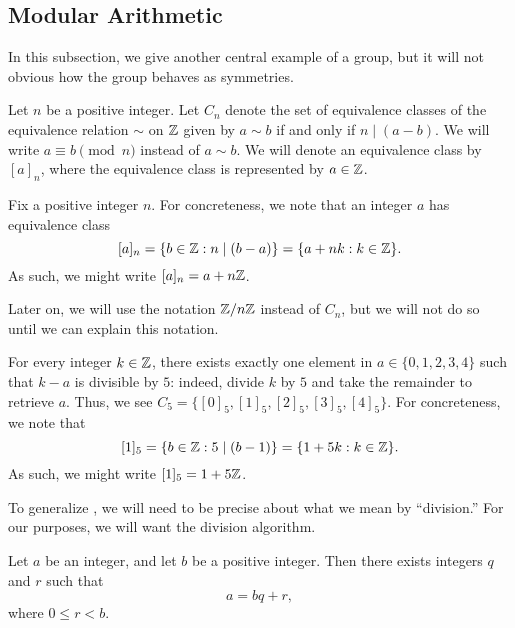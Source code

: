 \documentclass[../notes.tex]{subfiles}
\begin{document}
\subsection{Modular Arithmetic} \label{subsec:mods}
In this subsection, we give another central example of a group, but it will not obvious how the group behaves as symmetries.
\begin{definition}
    Let $n$ be a positive integer. Let $C_n$ denote the set of equivalence classes of the equivalence relation $\sim$ on $\mathbb Z$ given by $a\sim b$ if and only if $n\mid(a-b)$. We will write $a\equiv b\pmod n$ instead of $a\sim b$. We will denote an equivalence class by $[a]_n$, where the equivalence class is represented by $a\in\mathbb Z$.
\end{definition}
\begin{remark} \label{rem:concrete-coset}
    Fix a positive integer $n$. For concreteness, we note that an integer $a$ has equivalence class
    \[[a]_n=\{b\in\mathbb Z:n\mid(b-a)\}=\{a+nk:k\in\mathbb Z\}.\]
    As such, we might write $[a]_n=a+n\mathbb Z$.
\end{remark}
Later on, we will use the notation $\mathbb Z/n\mathbb Z$ instead of $C_n$, but we will not do so until we can explain this notation.
\begin{example} \label{ex:mod-5}
    For every integer $k\in\mathbb Z$, there exists exactly one element in $a\in\{0,1,2,3,4\}$ such that $k-a$ is divisible by $5$: indeed, divide $k$ by $5$ and take the remainder to retrieve $a$. Thus, we see $C_5=\{[0]_5,[1]_5,[2]_5,[3]_5,[4]_5\}$. For concreteness, we note that
    \[[1]_5=\{b\in\mathbb Z:5\mid(b-1)\}=\{1+5k:k\in\mathbb Z\}.\]
    As such, we might write $[1]_5=1+5\mathbb Z$.
\end{example}
To generalize , we will need to be precise about what we mean by ``division.'' For our purposes, we will want the division algorithm.
\begin{theorem} \label{thm:division}
    Let $a$ be an integer, and let $b$ be a positive integer. Then there exists integers $q$ and $r$ such that
    \[a=bq+r,\]
    where $0\le r<b$.
\end{theorem}
\end{document}

